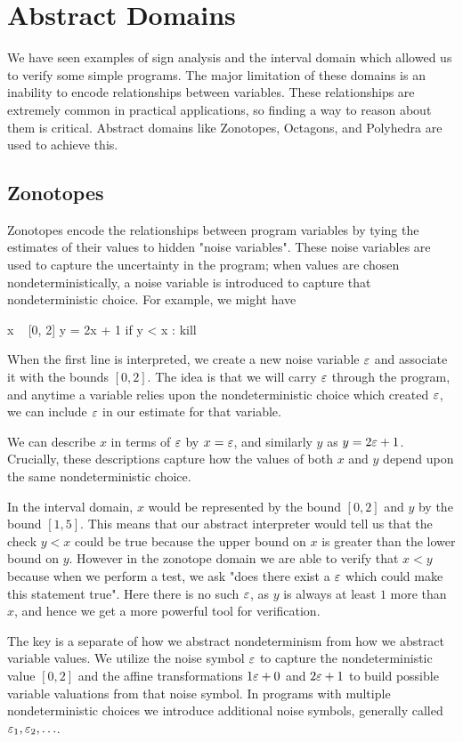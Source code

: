\chapter{Abstract Domains}
We have seen examples of sign analysis and the interval domain which allowed us to verify some simple programs.
The major limitation of these domains is an inability to encode relationships between variables.
These relationships are extremely common in practical applications, so finding a way to reason about them is critical.
Abstract domains like Zonotopes, Octagons, and Polyhedra are used to achieve this.

\section{Zonotopes}
Zonotopes encode the relationships between program variables by tying the estimates of their values to hidden "noise variables".
These noise variables are used to capture the uncertainty in the program; when values are chosen nondeterministically, a noise variable is introduced to capture that nondeterministic choice.
For example, we might have
\begin{code}
  x ~ [0, 2]
  y = 2x + 1
  if y < x :
    kill
\end{code}
When the first line is interpreted, we create a new noise variable $\varepsilon$ and associate it with the bounds $[0,2]$.
The idea is that we will carry $\varepsilon$ through the program, and anytime a variable relies upon the nondeterministic choice which created $\varepsilon$, we can include $\varepsilon$ in our estimate for that variable.

We can describe $x$ in terms of $\varepsilon$ by $x = \varepsilon$, and similarly $y$ as $y = 2\varepsilon + 1$.
Crucially, these descriptions capture how the values of both $x$ and $y$ depend upon the same nondeterministic choice.

In the interval domain, $x$ would be represented by the bound $[0, 2]$ and $y$ by the bound $[1, 5]$.
This means that our abstract interpreter would tell us that the check $y<x$ could be true because the upper bound on $x$ is greater than the lower bound on $y$.
However in the zonotope domain we are able to verify that $x < y$ because when we perform a test, we ask "does there exist a $\varepsilon$ which could make this statement true".
Here there is no such $\varepsilon$, as $y$ is always at least $1$ more than $x$, and hence we get a more powerful tool for verification.

The key is a separate of how we abstract nondeterminism from how we abstract variable values.
We utilize the noise symbol $\varepsilon$ to capture the nondeterministic value $[0,2]$ and the affine transformations $1 \varepsilon + 0$ and $2\varepsilon +1$ to build possible variable valuations from that noise symbol.
In programs with multiple nondeterministic choices we introduce additional noise symbols, generally called $\varepsilon_1, \varepsilon_2, \ldots$.

